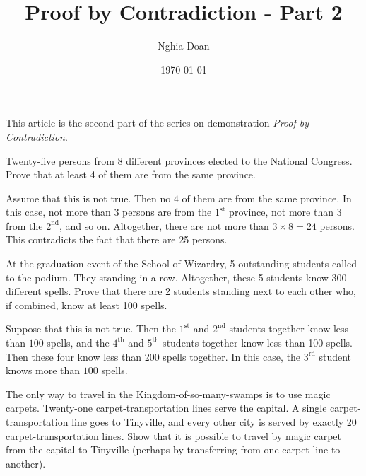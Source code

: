 \documentclass{article}
\title{Proof by Contradiction - Part 2}
\author{Nghia Doan}
\date{\today}
\begin{document}
\maketitle

This article is the second part of the series on demonstration \textit{Proof by Contradiction}.

\begin{example*}[Example 6]
    Twenty-five persons from 8 different provinces elected to the National Congress.
    Prove that at least 4 of them are from the same province.
\end{example*}

\begin{soln}
    Assume that this is not true. Then no $4$ of them are from the same province.
    In this case, not more than $3$ persons are from the $1^{\text{st}}$ province, not more than $3$ from the $2^{\text{nd}}$, and so on.
    Altogether, there are not more than $3 \times 8 = 24$ persons. This contradicts the fact that there are 25 persons.
\end{soln}

\begin{example*}[Example 7]
    At the graduation event of the School of Wizardry, 5 outstanding students called to the podium.
    They standing in a row. Altogether, these 5 students know 300 different spells.
    Prove that there are 2 students standing next to each other who, if combined, know at least 100 spells.
\end{example*}

\begin{soln}
    Suppose that this is not true. Then the $1^{\text{st}}$ and $2^{\text{nd}}$ students together know less than $100$ spells,
    and the $4^{\text{th}}$ and $5^{\text{th}}$ students together know less than 100 spells.
    Then these four know less than 200 spells together. In this case, the $3^{\text{rd}}$ student knows more than $100$ spells.
\end{soln}

\begin{example*}[Example 8]
    The only way to travel in the Kingdom-of-so-many-swamps is to use magic carpets.
    Twenty-one carpet-transportation lines serve the capital.
    A single carpet-transportation line goes to Tinyville,
    and every other city is served by exactly 20 carpet-transportation lines.
    Show that it is possible to travel by magic carpet from the capital to Tinyville
    (perhaps by transferring from one carpet line to another).
\end{example*}
\end{document}
